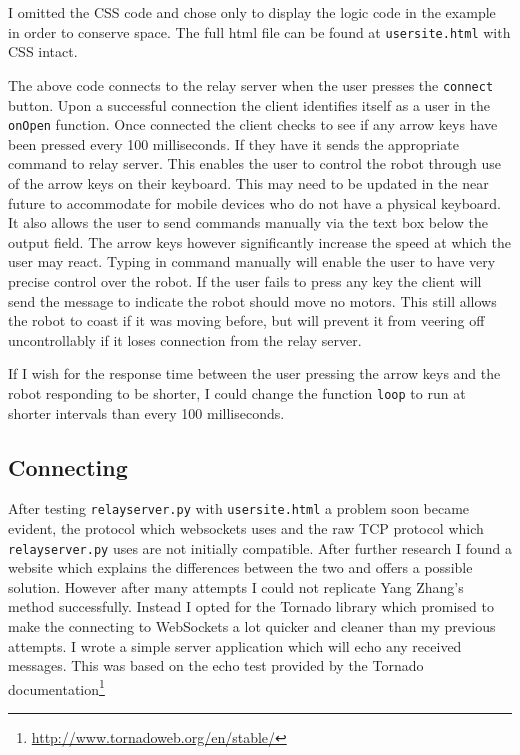 \documentclass[]{report}   %
\begin{document}
						I omitted the CSS code and chose only to display the logic code in the example in order to conserve space. The full html file
						can be found at \lstinline{usersite.html} with CSS intact.
						
						The above code connects to the relay server when the user presses the \lstinline{connect} button. Upon a successful connection
						the client identifies itself as a user in the \lstinline{onOpen} function. Once connected the client checks to see if any arrow
						keys have been pressed every 100 milliseconds. If they have it sends the appropriate command to relay server. This enables the
						user to control the robot through use of the arrow keys on their keyboard. This may need to be updated in the near future to
						accommodate for mobile devices who do not have a physical keyboard. It also allows the user to send commands manually via the
						text box below the output field. The arrow keys however significantly increase the speed at which the user may react. Typing in
						command manually will enable the user to have very precise control over the robot. If the user fails to press any key the client
						will send the message to indicate the robot should move no motors. This still allows the robot to coast if it was moving before,
						but will prevent it from veering off uncontrollably if it loses connection from the relay server.
						
						If I wish for the response time between the user pressing the arrow keys and the robot responding to be shorter, I could change the
						function \lstinline{loop} to run at shorter intervals than every 100 milliseconds.
					
					\subsection{Connecting}
						After testing \lstinline{relayserver.py} with \lstinline{usersite.html} a problem soon became evident, the protocol which websockets
						uses and the raw TCP protocol which \lstinline{relayserver.py} uses are not initially compatible. After further research I found
						a website\cite{websockets} which explains the differences between the two and offers a possible solution. However after many
						attempts I could not replicate  Yang Zhang's method successfully. Instead I opted for the Tornado library which promised to make
						the connecting to WebSockets a lot quicker and cleaner than my previous attempts. I wrote a simple server application which
						will echo any received messages. This was based on the echo test provided by the Tornado documentation\footnote{\url{http://www.tornadoweb.org/en/stable/}}
							
						
\end{document}

